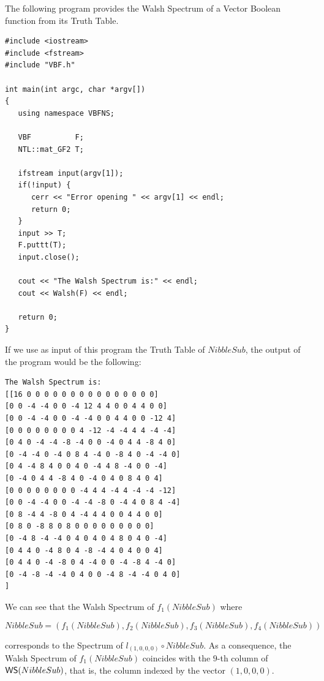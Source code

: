 \begin{example}
The following program provides the Walsh Spectrum of a Vector Boolean function from its Truth Table.

\begin{verbatim}
#include <iostream>
#include <fstream>
#include "VBF.h"

int main(int argc, char *argv[])
{
   using namespace VBFNS;

   VBF          F;
   NTL::mat_GF2 T;

   ifstream input(argv[1]);
   if(!input) {
      cerr << "Error opening " << argv[1] << endl;
      return 0;
   }
   input >> T;
   F.puttt(T);
   input.close();

   cout << "The Walsh Spectrum is:" << endl;
   cout << Walsh(F) << endl;

   return 0;
}
\end{verbatim}

If we use as input of this program the Truth Table of $NibbleSub$, the output of the program would be the following:

\begin{verbatim}
The Walsh Spectrum is:
[[16 0 0 0 0 0 0 0 0 0 0 0 0 0 0 0]
[0 0 -4 -4 0 0 -4 12 4 4 0 0 4 4 0 0]
[0 0 -4 -4 0 0 -4 -4 0 0 4 4 0 0 -12 4]
[0 0 0 0 0 0 0 0 4 -12 -4 -4 4 4 -4 -4]
[0 4 0 -4 -4 -8 -4 0 0 -4 0 4 4 -8 4 0]
[0 -4 -4 0 -4 0 8 4 -4 0 -8 4 0 -4 -4 0]
[0 4 -4 8 4 0 0 4 0 -4 4 8 -4 0 0 -4]
[0 -4 0 4 4 -8 4 0 -4 0 4 0 8 4 0 4]
[0 0 0 0 0 0 0 0 -4 4 4 -4 4 -4 -4 -12]
[0 0 -4 -4 0 0 -4 -4 -8 0 -4 4 0 8 4 -4]
[0 8 -4 4 -8 0 4 -4 4 4 0 0 4 4 0 0]
[0 8 0 -8 8 0 8 0 0 0 0 0 0 0 0 0]
[0 -4 8 -4 -4 0 4 0 4 0 4 8 0 4 0 -4]
[0 4 4 0 -4 8 0 4 -8 -4 4 0 4 0 0 4]
[0 4 4 0 -4 -8 0 4 -4 0 0 -4 -8 4 -4 0]
[0 -4 -8 -4 -4 0 4 0 0 -4 8 -4 -4 0 4 0]
]
\end{verbatim}

\begin{remark}
We can see that the Walsh Spectrum of $f_1(NibbleSub)$ where 

\begin{equation}
NibbleSub=(f_1(NibbleSub),f_2(NibbleSub),f_3(NibbleSub),f_4(NibbleSub))
\end{equation}

corresponds to the Spectrum of $l_{(1,0,0,0)} \circ NibbleSub$. As a consequence, the Walsh Spectrum of $f_1(NibbleSub)$ coincides with the $9$-th column of $\matr{WS}(NibbleSub)$, that is, the column indexed by the vector $(1,0,0,0)$.
\end{remark}

\end{example}

